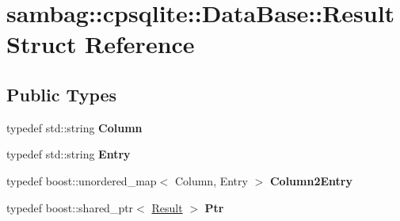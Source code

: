 \hypertarget{structsambag_1_1cpsqlite_1_1_data_base_1_1_result}{
\section{sambag::cpsqlite::DataBase::Result Struct Reference}
\label{structsambag_1_1cpsqlite_1_1_data_base_1_1_result}
}
\subsection*{Public Types}
\begin{DoxyCompactItemize}
\item 
\hypertarget{structsambag_1_1cpsqlite_1_1_data_base_1_1_result_aeff7c0d682bc312574966dac308a2efa}{
typedef std::string {\bfseries Column}}
\label{structsambag_1_1cpsqlite_1_1_data_base_1_1_result_aeff7c0d682bc312574966dac308a2efa}

\item 
\hypertarget{structsambag_1_1cpsqlite_1_1_data_base_1_1_result_a73d6cbd4a057fa8e8d638923b30b637e}{
typedef std::string {\bfseries Entry}}
\label{structsambag_1_1cpsqlite_1_1_data_base_1_1_result_a73d6cbd4a057fa8e8d638923b30b637e}

\item 
\hypertarget{structsambag_1_1cpsqlite_1_1_data_base_1_1_result_ab8c528e3cd53f38a92bc386d71166a74}{
typedef boost::unordered\_\-map$<$ Column, Entry $>$ {\bfseries Column2Entry}}
\label{structsambag_1_1cpsqlite_1_1_data_base_1_1_result_ab8c528e3cd53f38a92bc386d71166a74}

\item 
\hypertarget{structsambag_1_1cpsqlite_1_1_data_base_1_1_result_a3fd0721c8a3543b60ab4f935af59e585}{
typedef boost::shared\_\-ptr$<$ \hyperlink{structsambag_1_1cpsqlite_1_1_data_base_1_1_result}{Result} $>$ {\bfseries Ptr}}
\label{structsambag_1_1cpsqlite_1_1_data_base_1_1_result_a3fd0721c8a3543b60ab4f935af59e585}

\end{DoxyCompactItemize}
